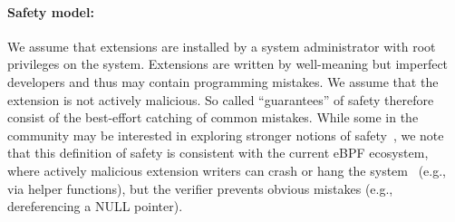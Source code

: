 \paragraph{Safety model:} We assume that extensions are installed by a system administrator with
root privileges on the system.  Extensions are written by well-meaning
but imperfect developers and thus may contain programming mistakes.
We assume that the extension is not actively malicious.  So called
``guarantees'' of safety therefore consist of the best-effort catching
of common mistakes.  While some in the community may be interested in
exploring stronger notions of safety~\cite{unprivileged-ebpf,jia2023},
we note that this definition of safety is consistent with the current
eBPF ecosystem, where actively malicious extension writers can crash
or hang the
system~\cite{untenableVerification,ebpf-stackoverflow,ebpf-termination}
(e.g., via helper functions), but the verifier prevents obvious
mistakes (e.g., dereferencing a NULL pointer).
